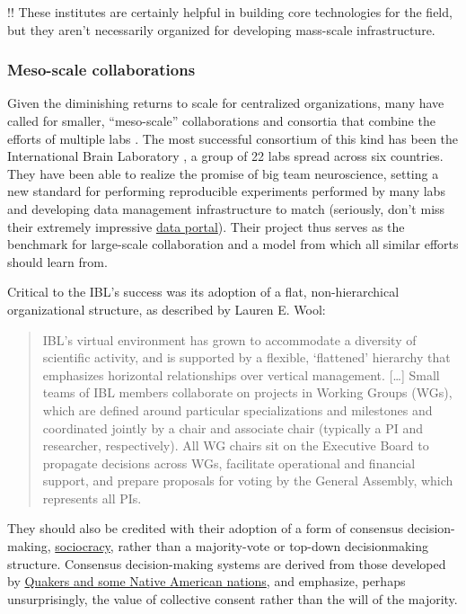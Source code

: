 \documentclass[10pt]{article}
\begin{document}
\begin{multicols}{2}
!! These institutes are certainly helpful in building core technologies
for the field, but they aren't necessarily organized for developing
mass-scale infrastructure.

\hypertarget{meso-scale-collaborations}{%
\subsubsection{Meso-scale
collaborations}\label{meso-scale-collaborations}}

Given the diminishing returns to scale for centralized organizations,
many have called for smaller, ``meso-scale'' collaborations and
consortia that combine the efforts of multiple labs \cite{mainenBetterWayCrack2016} . The most successful consortium of this
kind has been the International Brain Laboratory \cite{abbottInternationalLaboratorySystems2017, woolKnowledgeNetworksHow2020} , a group of 22 labs spread across six countries. They have been
able to realize the promise of big team neuroscience, setting a new
standard for performing reproducible experiments performed by many labs
\cite{laboratoryStandardizedReproducibleMeasurement2020}  and
developing data management infrastructure to match \cite{laboratoryDataArchitectureLargescale2020}  (seriously, don't miss
their extremely impressive
\href{https://data.internationalbrainlab.org/}{data portal}). Their
project thus serves as the benchmark for large-scale collaboration and a
model from which all similar efforts should learn from.

Critical to the IBL's success was its adoption of a flat,
non-hierarchical organizational structure, as described by Lauren E.
Wool:

\begin{quote}
IBL's virtual environment has grown to accommodate a diversity of
scientific activity, and is supported by a flexible, `flattened'
hierarchy that emphasizes horizontal relationships over vertical
management. {[}\ldots{]} Small teams of IBL members collaborate on
projects in Working Groups (WGs), which are defined around particular
specializations and milestones and coordinated jointly by a chair and
associate chair (typically a PI and researcher, respectively). All WG
chairs sit on the Executive Board to propagate decisions across WGs,
facilitate operational and financial support, and prepare proposals for
voting by the General Assembly, which represents all PIs. \cite{woolKnowledgeNetworksHow2020} 
\end{quote}

They should also be credited with their adoption of a form of consensus
decision-making, \href{https://sociocracy.info}{sociocracy}, rather than
a majority-vote or top-down decisionmaking structure. Consensus
decision-making systems are derived from those developed by
\href{https://rhizomenetwork.wordpress.com/2011/06/18/a-brief-history-of-consenus-decision-making/}{Quakers
and some Native American nations}, and emphasize, perhaps
unsurprisingly, the value of collective consent rather than the will of
the majority.


\end{multicols}
\end{document}
